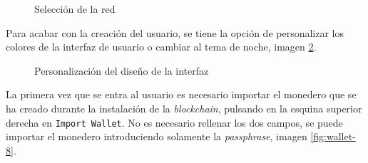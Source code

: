 \begin{figure}[H]
	\centering
	\caption{Selección de la red}
	\label{fig:wallet-6}
\end{figure}

Para acabar con la creación del usuario, se tiene la opción de personalizar los colores de la interfaz de usuario o cambiar al tema de noche, imagen \ref{fig:wallet-7}.

\begin{figure}[H]
	\centering
	\caption{Personalización del diseño de la interfaz}
	\label{fig:wallet-7}
\end{figure}

\newpage
La primera vez que se entra al usuario es necesario importar el monedero que se ha creado durante la instalación de la \textit{blockchain}, pulsando en la esquina superior derecha en \texttt{Import Wallet}. No es necesario rellenar los dos campos, se puede importar el monedero introduciendo solamente la \textit{passphrase}, imagen \ref{fig:wallet-8}.

